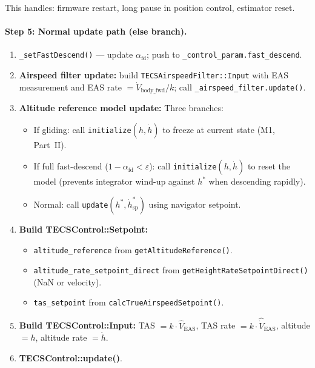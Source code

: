 \documentclass[12pt,a4paper]{article}
\begin{document}
This handles: firmware restart, long pause in position control,
estimator reset.

\paragraph{Step 5: Normal update path (else branch).}

\begin{enumerate}
  \item \texttt{\_setFastDescend()} --- update $\alpha_{\text{fd}}$;
        push to \texttt{\_control\_param.fast\_descend}.

  \item \textbf{Airspeed filter update:}
        build \texttt{TECSAirspeedFilter::Input} with EAS measurement
        and EAS rate $= \dot{V}_{\text{body\_fwd}} / k$;
        call \texttt{\_airspeed\_filter.update()}.

  \item \textbf{Altitude reference model update:}
        Three branches:
        \begin{itemize}
          \item If gliding: call \texttt{initialize}$(h, \dot{h})$
                to freeze at current state (M1, Part~II).
          \item If full fast-descend ($1 - \alpha_{\text{fd}} < \varepsilon$):
                call \texttt{initialize}$(h, \dot{h})$ to reset
                the model (prevents integrator wind-up against $h^*$
                when descending rapidly).
          \item Normal: call \texttt{update}$(h^*, \dot{h}^*_{\text{sp}})$
                using navigator setpoint.
        \end{itemize}

  \item \textbf{Build TECSControl::Setpoint:}
        \begin{itemize}
          \item \texttt{altitude\_reference} from \texttt{getAltitudeReference()}.
          \item \texttt{altitude\_rate\_setpoint\_direct} from
                \texttt{getHeightRateSetpointDirect()} (NaN or velocity).
          \item \texttt{tas\_setpoint} from \texttt{calcTrueAirspeedSetpoint()}.
        \end{itemize}

  \item \textbf{Build TECSControl::Input:}
        TAS $= k \cdot \hat{V}_{\text{EAS}}$, TAS rate $= k \cdot \hat{\dot{V}}_{\text{EAS}}$,
        altitude $= h$, altitude rate $= \dot{h}$.

  \item \textbf{TECSControl::update()}.
\end{enumerate}
\end{document}
